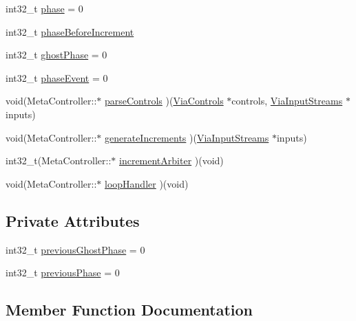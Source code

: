 \begin{DoxyCompactItemize}
\item 
int32\+\_\+t \mbox{\hyperlink{class_meta_controller_a46db61d62388f7d72047cc188d67bddc}{phase}} = 0
\item 
int32\+\_\+t \mbox{\hyperlink{class_meta_controller_ad460161d10335de5227b5b15e523adb6}{phase\+Before\+Increment}}
\item 
int32\+\_\+t \mbox{\hyperlink{class_meta_controller_ada896e87923a5660cba1889692c67f3d}{ghost\+Phase}} = 0
\item 
int32\+\_\+t \mbox{\hyperlink{class_meta_controller_a00854d18e1394459842769c712ac1c81}{phase\+Event}} = 0
\item 
void(Meta\+Controller\+::$\ast$ \mbox{\hyperlink{class_meta_controller_a2dca0b0a40e81430fd22cbce198c2b5b}{parse\+Controls}} )(\mbox{\hyperlink{class_via_controls}{Via\+Controls}} $\ast$controls, \mbox{\hyperlink{class_via_input_streams}{Via\+Input\+Streams}} $\ast$inputs)
\item 
void(Meta\+Controller\+::$\ast$ \mbox{\hyperlink{class_meta_controller_a9cece3599531090186f2e21e26638579}{generate\+Increments}} )(\mbox{\hyperlink{class_via_input_streams}{Via\+Input\+Streams}} $\ast$inputs)
\item 
int32\+\_\+t(Meta\+Controller\+::$\ast$ \mbox{\hyperlink{class_meta_controller_ab4825810085dd530123a7dcf99594780}{increment\+Arbiter}} )(void)
\item 
void(Meta\+Controller\+::$\ast$ \mbox{\hyperlink{class_meta_controller_ad7a9bfb22b8149d17e32fa5ffd0eb025}{loop\+Handler}} )(void)
\end{DoxyCompactItemize}
\subsection*{Private Attributes}
\begin{DoxyCompactItemize}
\item 
int32\+\_\+t \mbox{\hyperlink{class_meta_controller_acf1f6b23d24cae56383d278aaaf2b6d6}{previous\+Ghost\+Phase}} = 0
\item 
int32\+\_\+t \mbox{\hyperlink{class_meta_controller_afbdb66d7673f39db7b252cdc64b0175f}{previous\+Phase}} = 0
\end{DoxyCompactItemize}


\subsection{Member Function Documentation}
\mbox{\label{class_meta_controller_aaca3bcd3c1ad139f9743d95f206d53b6}} 
